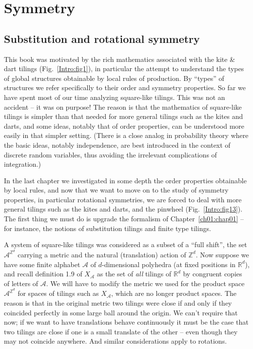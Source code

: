 \documentclass[reqno]{stml-l}
\theoremstyle{plain}
\theoremstyle{definition}
\numberwithin{equation}{chapter}
\begin{document}

\chapter{Symmetry \label{ch04:chap04}}

\section{Substitution and rotational symmetry}\label{ch04:sec1}

This book was motivated by the rich mathematics associated with the kite \& dart tilings (Fig.~\ref{Intro:fig1}), in particular the attempt to understand the types of global structures obtainable by local rules of production. By ``types'' of structures we refer specifically to their order and symmetry properties. So far we have spent most of our time analyzing square-like tilings. This was not an accident -- it was on purpose! The reason is that the mathematics of square-like tilings is simpler than that needed for more general tilings such as the kites and darts, and some ideas, notably that of order properties, can be understood more easily in that simpler setting. (There is a close analog in probability theory where the basic ideas, notably independence, are best introduced in the context of discrete random variables, thus avoiding the irrelevant complications of integration.)

In the last chapter we investigated in some depth the order properties obtainable by local rules, and now that we want to move on to the study of symmetry properties, in particular rotational symmetries, we are forced to deal with more general tilings such as the kites and darts, and the pinwheel (Fig.~\ref{Intro:fig13}). The first thing we must do is upgrade the formalism of Chapter~\ref{ch01:chap01} -- for instance, the notions of substitution tilings and finite type tilings.

A system of square-like tilings was considered as a subset of a ``full shift'', the set $\mathcal{A}^{\mathbb{Z}^{d}}$ carrying a metric and the natural (translation) action of $\mathbb{Z}^{d}$. Now suppose we have some finite alphabet $\mathcal{A}$ of $d$-dimensional polyhedra (at fixed positions in $\mathbb{R}^{d}$), and recall definition 1.9 of $X_{\mathcal{A}}$ as the set of \emph{all} tilings of $\mathbb{R}^{d}$ by congruent copies of letters of $\mathcal{A}$. We will have to modify the metric we used for the product space $\mathcal{A}^{\mathbb{Z}^{d}}$ for spaces of tilings such as $X_{\mathcal{A}}$, which are no longer product spaces. The reason is that in the original metric two tilings were close if and only if they coincided perfectly in some large ball around the origin. We can't require that now; if we want to have translations behave continuously it must be the case that two tilings are close if one is a small translate of the other -- even though they may not coincide anywhere. And similar considerations apply to rotations.
\end{document}
